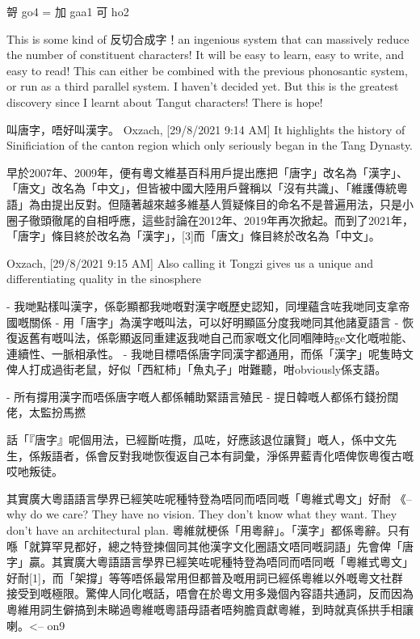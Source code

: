 \documentclass[a5paper, 10pt, openany]{book} %
\begin{document}
哿 go4 = 加 gaa1 可 ho2

This is some kind of 反切合成字！an ingenious system that can massively reduce the number of constituent characters! It will be easy to learn, easy to write, and easy to read! This can either be combined with the previous phonosantic system, or run as a third parallel system. I haven't decided yet. But this is the greatest discovery since I learnt about Tangut characters! There is hope!


叫唐字，唔好叫漢字。
Oxzach, [29/8/2021 9:14 AM]
It highlights the history of Sinificiation of the canton region which only seriously began in the Tang Dynasty.

早於2007年、2009年，便有粵文維基百科用戶提出應把「唐字」改名為「漢字」、「唐文」改名為「中文」，但皆被中國大陸用戶聲稱以「沒有共識」、「維護傳統粵語」為由提出反對。但隨著越來越多維基人質疑條目的命名不是普遍用法，只是小圈子徹頭徹尾的自相呼應，這些討論在2012年、2019年再次掀起。而到了2021年，「唐字」條目終於改名為「漢字」，[3]而「唐文」條目終於改名為「中文」。

Oxzach, [29/8/2021 9:15 AM]
Also calling it Tongzi gives us a unique and differentiating quality in the sinosphere


- 我哋點樣叫漢字，係彰顯都我哋嘅對漢字嘅歷史認知，同埋蘊含咗我哋同支拿帝國嘅關係
- 用「唐字」為漢字嘅叫法，可以好明顯區分度我哋同其他諸夏語言
- 恢復返舊有嘅叫法，係彰顯返同重建返我哋自己而家嘅文化同嗰陣時ge文化嘅啦能、連續性、一脈相承性。
- 我哋目標唔係唐字同漢字都通用，而係「漢字」呢隻時文俾人打成過街老鼠，好似「西紅柿」「魚丸子」咁難聽，咁obviously係支語。

- 所有撐用漢字而唔係唐字嘅人都係輔助緊語言殖民
- 提日韓嘅人都係冇錢扮闊佬，太監扮馬撚

話「『唐字』呢個用法，已經斷咗攬，瓜咗，好應該退位讓賢」嘅人，係中文先生，係叛語者，係會反對我哋恢復返自己本有詞彙，淨係畀藍青化唔俾恢粵復古嘅哎吔叛徒。

其實廣大粵語語言學界已經笑咗呢種特登為唔同而唔同嘅「粵維式粵文」好耐 《-- why do we care? They have no vision. They don't know what they want. They don't have an architectural plan.
粵維就梗係「用粵辭」。「漢字」都係粵辭。只有喺「就算罕見都好，總之特登揀個同其他漢字文化圈語文唔同嘅詞語」先會俾「唐字」贏。其實廣大粵語語言學界已經笑咗呢種特登為唔同而唔同嘅「粵維式粵文」好耐[1]，而「架撐」等等唔係最常用但都普及嘅用詞已經係粵維以外嘅粵文社群接受到嘅極限。驚俾人同化嘅話，唔會在於粵文用多幾個內容語共通詞，反而因為粵維用詞生僻搞到未睇過粵維嘅粵語母語者唔夠膽貢獻粵維，到時就真係拱手相讓喇。<-- on9
\end{document}
